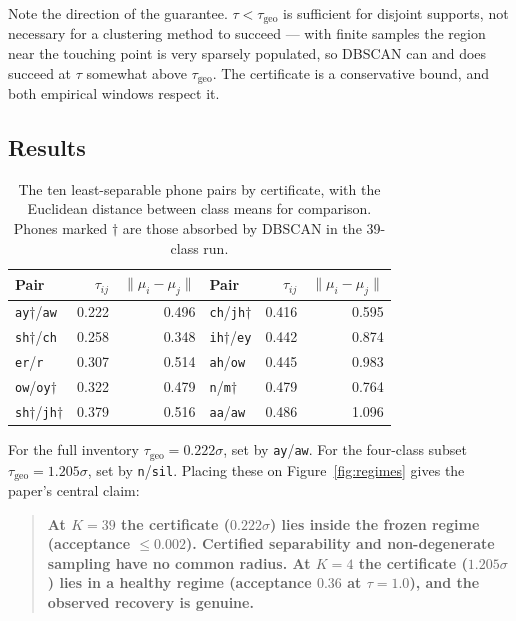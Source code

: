 \documentclass[11pt]{article}
\newcommand{\ph}[1]{\texttt{#1}}
\newcommand{\tgeo}{\tau_{\mathrm{geo}}}
\begin{document}
Note the direction of the guarantee. $\tau < \tgeo$ is sufficient for disjoint
supports, not necessary for a clustering method to succeed --- with finite
samples the region near the touching point is very sparsely populated, so
DBSCAN can and does succeed at $\tau$ somewhat above $\tgeo$. The certificate is
a conservative bound, and both empirical windows respect it.

\subsection{Results}

\begin{table}[H]
\centering
\caption{The ten least-separable phone pairs by certificate, with the Euclidean
distance between class means for comparison. Phones marked $\dagger$ are those
absorbed by DBSCAN in the 39-class run.}
\label{tab:pairs}
\begin{tabular}{lrr@{\qquad}lrr}
\toprule
Pair & $\tau_{ij}$ & $\|\mu_i-\mu_j\|$ & Pair & $\tau_{ij}$ & $\|\mu_i-\mu_j\|$ \\
\midrule
\ph{ay}$\dagger$/\ph{aw} & 0.222 & 0.496 & \ph{ch}/\ph{jh}$\dagger$  & 0.416 & 0.595 \\
\ph{sh}$\dagger$/\ph{ch} & 0.258 & 0.348 & \ph{ih}$\dagger$/\ph{ey}  & 0.442 & 0.874 \\
\ph{er}/\ph{r}           & 0.307 & 0.514 & \ph{ah}/\ph{ow}           & 0.445 & 0.983 \\
\ph{ow}/\ph{oy}$\dagger$ & 0.322 & 0.479 & \ph{n}/\ph{m}$\dagger$    & 0.479 & 0.764 \\
\ph{sh}$\dagger$/\ph{jh}$\dagger$ & 0.379 & 0.516 & \ph{aa}/\ph{aw}  & 0.486 & 1.096 \\
\bottomrule
\end{tabular}
\end{table}

For the full inventory $\tgeo = 0.222\sigma$, set by \ph{ay}/\ph{aw}. For the
four-class subset $\tgeo = 1.205\sigma$, set by \ph{n}/\ph{sil}. Placing these
on Figure~\ref{fig:regimes} gives the paper's central claim:

\begin{quote}
\textbf{At $K=39$ the certificate ($0.222\sigma$) lies inside the frozen regime
(acceptance $\le 0.002$). Certified separability and non-degenerate sampling
have no common radius. At $K=4$ the certificate ($1.205\sigma$) lies in a
healthy regime (acceptance $0.36$ at $\tau=1.0$), and the observed recovery is
genuine.}
\end{quote}
\end{document}
